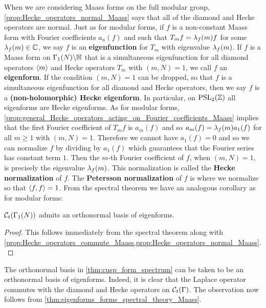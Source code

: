       When we are considering Maass forms on the full modular group, \cref{prop:Hecke_operators_normal_Maass} says that all of the diamond and Hecke operators are normal. Just as for modular forms, if $f$ is a non-constant Maass form with Fourier coefficients $a_{n}(f)$ and such that $T_{m}f = \lambda_{f}(m)f$ for some $\lambda_{f}(m) \in \mathbb{C}$, we say $f$ is an \textbf{eigenfunction} for $T_{m}$ with eigenvalue $\lambda_{f}(m)$. If $f$ is a Maass form on $\Gamma_{1}(N)\backslash\mathbb{H}$ that is a simultaneous eigenfunction for all diamond operators $\langle m\rangle$ and Hecke operators $T_{m}$ with $(m,N) = 1$, we call $f$ an \textbf{eigenform}. If the condition $(m,N) = 1$ can be dropped, so that $f$ is a simultaneous eigenfunction for all diamond and Hecke operators, then we say $f$ is a \textbf{(non-holomorphic) Hecke eigenform}. In particular, on $\mathrm{PSL}_{2}(\mathbb{Z})$ all eigenforms are Hecke eigenforms. As for modular forms, \cref{prop:general_Hecke_operators_acting_on_Fourier_coefficients_Maass} implies that the first Fourier coefficient of $T_{m}f$ is $a_{m}(f)$ and so $a_{m}(f) = \lambda_{f}(m)a_{1}(f)$ for all $m \ge 1$ with $(m,N) = 1$. Therefore we cannot have $a_{1}(f) = 0$ and so we can normalize $f$ by dividing by $a_{1}(f)$ which guarantees that the Fourier series has constant term $1$. Then the $m$-th Fourier coefficient of $f$, when $(m,N) = 1$, is precisely the eigenvalue $\lambda_{f}(m)$. This normalization is called the \textbf{Hecke normalization} of $f$. The \textbf{Petersson normalization} of $f$ is where we normalize so that $\langle f,f\rangle = 1$. From the spectral theorem we have an analogous corollary as for modular forms:

      \begin{theorem}\label{thm:eigenforms_forms_spectral_theory_Maass}
        $\mathcal{C}_{t}(\Gamma_{1}(N))$ admits an orthonormal basis of eigenforms.
      \end{theorem}
      \begin{proof}
        This follows immediately from the spectral theorem along with \cref{prop:Hecke_operators_commute_Maass,prop:Hecke_operators_normal_Maass}.
      \end{proof}

      The orthonormal basis in \cref{thm:cusp_form_spectrum} can be taken to be an orthonormal basis of eigenforms. Indeed, it is clear that the Laplace operator commutes with the diamond and Hecke operators on $\mathcal{C}_{t}(\Gamma)$. The observation now follows from \cref{thm:eigenforms_forms_spectral_theory_Maass}.
